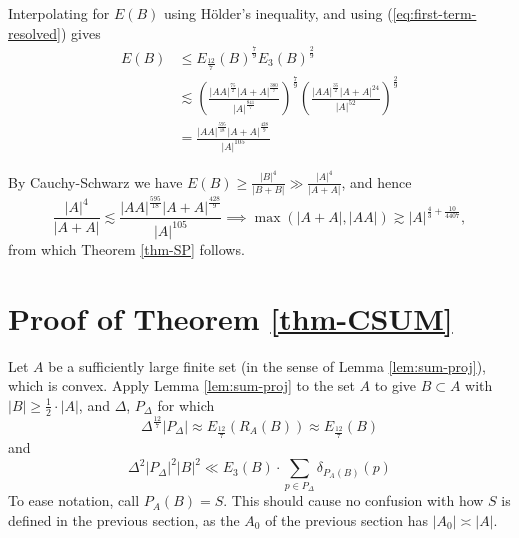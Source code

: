 \documentclass[reqno]{amsart}
\newcommand{\holder}{H\"older}
\numberwithin{equation}{section}
\begin{document}
Interpolating for \(E(B)\) using \holder's inequality, and using (\ref{eq:first-term-resolved}) gives
\begin{align*}
E(B) & \leq  E_{\frac{12}{7} } (B)^{\frac{7}{9} }  E_3(B)  ^{\frac{2}{9} } \\
& \lesssim \left( \frac{\left\lvert AA \right\rvert ^{\frac{75}{2} } \left\lvert A+A \right\rvert ^{\frac{380}{7} }}{\left\lvert A \right\rvert ^{\frac{841}{7} }}  \right) ^{\frac{7}{9} } \left( \frac{\left\lvert AA \right\rvert ^{\frac{35}{2} } \left\lvert A + A \right\rvert ^{24}}{\left\lvert A \right\rvert ^{52}}  \right) ^{\frac{2}{9} }\\
& = \frac{\left\lvert AA \right\rvert ^{\frac{595}{18}} \left\lvert A+A \right\rvert^{\frac{428}{9}} }{\left\lvert A \right\rvert ^{105}} 
\end{align*}

By Cauchy-Schwarz we have \(E(B) \geq \frac{\left\lvert B \right\rvert ^{4}}{\left\lvert B+B \right\rvert } \gg \frac{\left\lvert A \right\rvert ^{4}}{\left\lvert A+A \right\rvert }  \), and hence
\[
    \frac{\left\lvert A \right\rvert ^{4}}{\left\lvert A + A \right\rvert } \lesssim \frac{\left\lvert AA \right\rvert ^{\frac{595}{18}} \left\lvert A+A \right\rvert^{\frac{428}{9}} }{\left\lvert A \right\rvert ^{105}} \implies \max (\left\lvert A+A \right\rvert , \left\lvert AA \right\rvert )\gtrsim \left\lvert A \right\rvert ^{\frac{4}{3}  + \frac{10}{4407}}
,\]
from which Theorem \ref{thm-SP} follows.

\bigskip

\section{Proof of Theorem \ref{thm-CSUM}}\label{section:CSUM}
Let \(A\) be a sufficiently large finite set (in the sense of Lemma \ref{lem:sum-proj}), which is convex.
Apply Lemma \ref{lem:sum-proj} to the set \(A\) to give \(B \subset A\) with
\(\left\lvert B \right\rvert \geq \frac{1}{2} \cdot \left\lvert A \right\rvert \), and \(\Delta\), \(P_{\Delta} \) for which
\[
    \Delta^{\frac{12}{7} } \left\lvert P_{\Delta}  \right\rvert \approx E_{\frac{12}{7} } \left( R_{A} (B) \right) \approx E_{\frac{12}{7} } (B) 
\]
and
\begin{equation} \label{eq:CSUM-from-lemma}
    \Delta ^{2} \left\lvert P_{\Delta}  \right\rvert ^{2} \left\lvert B \right\rvert ^{2} \ll E_3(B) \cdot \sum _{p \in P_{\Delta} } \delta_{P_{A} (B)} (p)
\end{equation}
To ease notation, call \(P_{A} (B)= S\). This should cause no confusion with how \(S\) is defined in the previous section,
as the \(A_0\) of the previous section has \(\left\lvert A_0 \right\rvert \asymp \left\lvert A \right\rvert \).
\end{document}
